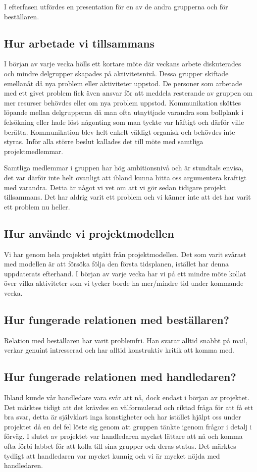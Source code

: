 \documentclass[a4paper,12pt,fleqn]{article}
\begin{document}
I efterfasen utfördes en presentation för en av de andra grupperna och för beställaren.


\subsection{Hur arbetade vi tillsammans}
I början av varje vecka hölls ett kortare möte där veckans arbete diskuterades och mindre delgrupper skapades på aktivitetsnivå. Dessa grupper skiftade emellanåt då nya problem eller aktiviteter uppstod. De personer som arbetade med ett givet problem fick även ansvar för att meddela resterande av gruppen om mer resurser behövdes eller om nya problem uppstod. Kommunikation sköttes löpande mellan delgrupperna då man ofta utnyttjade varandra som bollplank i felsökning eller hade löst någonting som man tyckte var häftigt och därför ville berätta. Kommunikation blev helt enkelt väldigt organisk och behövdes inte styras. 
Inför alla större beslut kallades det till möte med samtliga projektmedlemmar.

Samtliga medlemmar i gruppen har hög ambitionsnivå och är stundtals envisa, det var därför inte helt ovanligt att ibland kunna hitta oss argumentera kraftigt med varandra. Detta är något vi vet om att vi gör sedan tidigare projekt tillsammans. Det har aldrig varit ett problem och vi känner inte att det har varit ett problem nu heller.

\subsection{Hur använde vi projektmodellen}
Vi har genom hela projektet utgått från projektmodellen. Det som varit svårast med modellen är att försöka följa den första tidsplanen, istället har denna uppdaterats efterhand. I början av varje vecka har vi på ett mindre möte kollat över vilka aktiviteter som vi tycker borde ha mer/mindre tid under kommande vecka.

\subsection{Hur fungerade relationen med beställaren?}
Relation med beställaren har varit problemfri. Han svarar alltid snabbt på mail, verkar genuint intresserad och har alltid konstruktiv kritik att komma med.

\subsection{Hur fungerade relationen med handledaren?}
Ibland kunde vår handledare vara svår att nå, dock endast i början av projektet. Det märktes tidigt att det krävdes en välformulerad och riktad fråga för att få ett bra svar, detta är självklart inga konstigheter och har istället hjälpt oss under projektet då en del fel löste sig genom att gruppen tänkte igenom frågor i detalj i förväg. I slutet av projektet var handledaren mycket lättare att nå och komma ofta förbi labbet för att kolla till sina grupper och deras status. Det märktes tydligt att handledaren var mycket kunnig och vi är mycket nöjda med handledaren.
\end{document}
